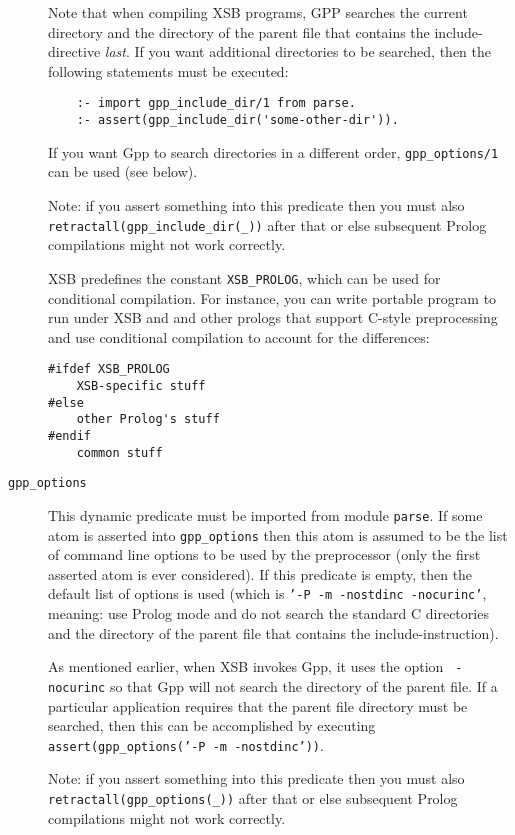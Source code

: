 \begin{description}
  Note that when compiling XSB programs, GPP searches the current directory
  and the directory of the parent file that contains the include-directive
  \emph{last}. If you want additional directories to be searched, then the
  following statements must be executed:
\begin{verbatim}
    :- import gpp_include_dir/1 from parse.
    :- assert(gpp_include_dir('some-other-dir')).
\end{verbatim}
  If you want Gpp to search directories in a different order,
  {\tt gpp\_options/1} can be used (see below).

   Note: if you assert something into this predicate then you must also {\tt
    retractall(gpp\_include\_dir(\_))} after that or else subsequent Prolog
  compilations might not work correctly.

  XSB predefines the constant {\tt XSB\_PROLOG}, which can be used for
  conditional compilation. For instance, you can write portable program
  to run under XSB and and other prologs that support C-style
  preprocessing and use conditional compilation to account for the
  differences: 
  \begin{samepage}
  \begin{verbatim}
#ifdef XSB_PROLOG
    XSB-specific stuff
#else
    other Prolog's stuff
#endif
    common stuff
  \end{verbatim}
  \end{samepage}

\item[{\tt gpp\_options}]  This dynamic predicate
  must be imported from module {\tt parse}.  If some atom is asserted into
  {\tt gpp\_options} then this atom is assumed to be the list of command
  line options to be used by the preprocessor (only the first asserted atom
  is ever considered). If this predicate is empty, then the default list of
  options is used (which is {\tt '-P -m -nostdinc -nocurinc'}, meaning: use
  Prolog mode and do not search the standard C directories and the
  directory of the parent file that contains the include-instruction).
  
  As mentioned earlier, when XSB invokes Gpp, it uses the option {\tt
    -nocurinc} so that Gpp will not search the directory of the parent file. 
  If a particular application requires that the parent file directory
  must be searched, then this can be accomplished by executing 
  {\tt assert(gpp\_options('-P -m -nostdinc'))}.
  
  Note: if you assert something into this predicate then you must also {\tt
    retractall(gpp\_options(\_))} after that or else subsequent Prolog
  compilations might not work correctly.
  

\end{description}
